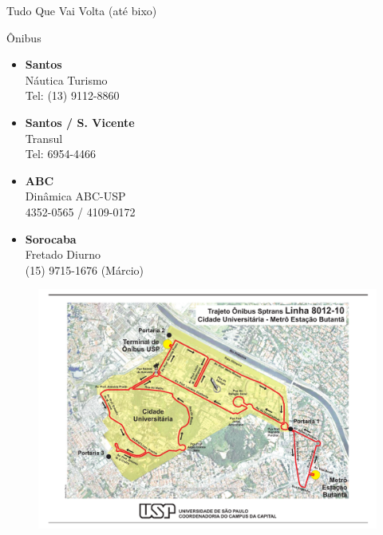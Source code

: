 \begin{secao}{Tudo Que Vai Volta (até bixo)}
\begin{subsecao}{Ônibus}
\begin{itemize}
  \item {\bf Santos}\\
    Náutica Turismo\\
    Tel: (13) 9112-8860

  \item {\bf Santos / S. Vicente}\\
    Transul\\
    Tel: 6954-4466

  \item {\bf ABC}\\
    Dinâmica ABC-USP\\
    4352-0565 / 4109-0172

  \item {\bf Sorocaba}\\
    Fretado Diurno\\
    (15) 9715-1676 (Márcio)

\end{itemize}

\end{subsecao}

\begin{figure}[H]
    \centering
    \includegraphics[height=\textwidth, angle=90]{img/8012-10.pdf}
\end{figure}


\end{secao}

